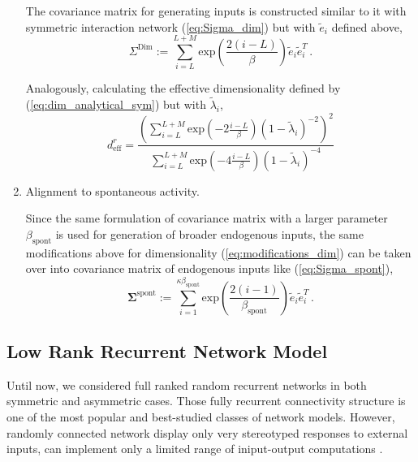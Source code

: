 \documentclass[11pt]{article}
\begin{document}
\begin{enumerate}
			  	  The covariance matrix for generating inputs is constructed similar to it with symmetric interaction network (\ref{eq:Sigma_dim}) but with $\tilde{e}_i$ defined above, 
			  	  	\begin{equation} \label{eq:modifications_dim}
			  	  		\Sigma^{\text{Dim}} := \sum_{i=L}^{L+M} \text{exp}\left(\frac{2(i-L)}{\beta}\right) \tilde{e}_i \tilde{e}_i^T \, .
			  	  	\end{equation}
		  	  	
		  	  	  Analogously, calculating the effective dimensionality defined by (\ref{eq:dim_analytical_sym}) but with $\tilde{\lambda}_i$,
		  	  	  	\begin{equation} \label{eq:modification_eff_dim}
		  	  	  		d^r_{\text{eff}} = \frac{\left(\sum_{i = L}^{L + M} \text{exp}\left(-2 \frac{i-L}{\beta}\right)(1-\tilde{\lambda}_i)^{-2}\right)^2}{\sum_{i=L}^{L+M} \text{exp}\left(-4 \frac{i-L}{\beta}\right)(1-\tilde{\lambda}_i)^{-4}}
		  	  	  	\end{equation}
		  	  	
			\item Alignment to spontaneous activity. %
				  
				  Since the same formulation of covariance matrix with a larger parameter $\beta_{\text{spont}}$ is used for generation of broader endogenous inputs, the same modifications above for dimensionality (\ref{eq:modifications_dim}) can be taken over into covariance matrix of endogenous inputs like (\ref{eq:Sigma_spont}),
				  	\begin{equation} \label{eq:Sigma_spont_asym}
				  		\mathbf{\Sigma}^{\text{spont}} := \sum_{i=1}^{\kappa\beta_{\text{spont}}} \text{exp}\left(\frac{2(i-1)}{\beta_{\text{spont}}}\right) \tilde{e}_i \tilde{e}_i^T \, .
				  	\end{equation}
				  
		\end{enumerate}
	
	\clearpage
	\subsection{Low Rank Recurrent Network Model}
	Until now, we considered full ranked random recurrent networks in both symmetric and asymmetric cases. Those fully recurrent connectivity structure is one of the most popular and best-studied classes of network models. However, randomly connected network display only very stereotyped responses to external inputs, can implement only a limited range of iniput-output computations \cite{mastrogiuseppe2018linking}. 
	
\end{document}
